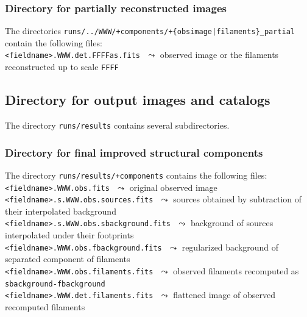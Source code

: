 \documentclass[a4paper,10pt]{article}
\begin{document}
\subsubsection{Directory for partially reconstructed images}
\label{partial}

The directories \verb!runs/../WWW/+components/+{obsimage|filaments}_partial! contain the following files:\\

\vspace{-2mm}\noindent
{\small\verb!<fieldname>.WWW.det.FFFFas.fits!} $\,\,\leadsto$ observed image or the filaments reconstructed up to scale \verb!FFFF!


\subsection{Directory for output images and catalogs}
\label{results}

The directory \verb!runs/results! contains several subdirectories.

\subsubsection{Directory for final improved structural components}
\label{pluscompon}

The directory \verb!runs/results/+components! contains the following files:\\

\vspace{-2mm}\noindent
{\small\verb!<fieldname>.WWW.obs.fits!} $\,\,\leadsto$ original observed image\\
{\small\verb!<fieldname>.s.WWW.obs.sources.fits!} $\,\,\leadsto$ sources obtained by subtraction of their interpolated background\\
{\small\verb!<fieldname>.s.WWW.obs.sbackground.fits!} $\,\,\leadsto$ background of sources interpolated under their footprints\\
{\small\verb!<fieldname>.WWW.obs.fbackground.fits!} $\,\,\leadsto$ regularized background of separated component of filaments\\
{\small\verb!<fieldname>.WWW.obs.filaments.fits!} $\,\,\leadsto$ observed filaments recomputed as \verb!sbackground-fbackground!\\
{\small\verb!<fieldname>.WWW.det.filaments.fits!} $\,\,\leadsto$ flattened image of observed recomputed filaments
\end{document}
